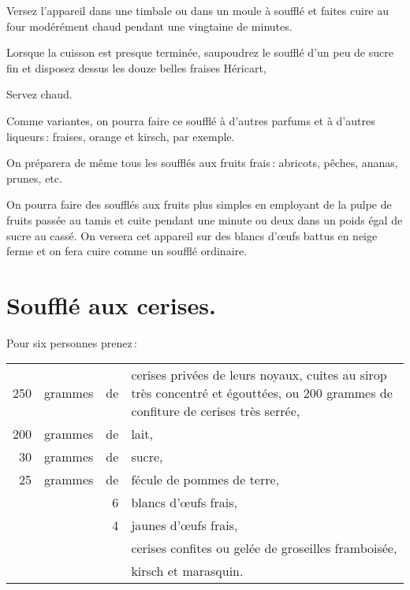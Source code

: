 Versez l'appareil dans une timbale ou dans un moule à soufflé et faites cuire au
four modérément chaud pendant une vingtaine de minutes.

Lorsque la cuisson est presque terminée, saupoudrez le soufflé d’un peu de
sucre fin et disposez dessus les douze belles fraises Héricart,

Servez chaud.

\sk

Comme variantes, on pourra faire ce soufflé à d'autres parfums et à d'autres
liqueurs : fraises, orange et kirsch, par exemple.

\sk

On préparera de même tous les soufflés aux fruits frais : abricots, pêches,
ananas, prunes, etc.

\sk

On pourra faire des soufflés aux fruits plus simples en employant de la pulpe
de fruits passée au tamis et cuite pendant une minute ou deux dans un poids égal
de sucre au cassé. On versera cet appareil sur des blancs d'œufs battus en neige
ferme et on fera cuire comme un soufflé ordinaire.

\section*{\centering Soufflé aux cerises.}
{}

Pour six personnes prenez :

\footnotesize
\begin{longtable}{rrrp{16em}}
    250 & grammes & de & cerises privées de leurs noyaux, cuites au sirop
                         très concentré et égouttées, ou 200 grammes de
                         confiture de cerises très serrée,                                                \\
    200 & grammes & de & lait,                                                                            \\
     30 & grammes & de & sucre,                                                                           \\
     25 & grammes & de & fécule de pommes de terre,                                                       \\
        &         &  6 & blancs d'œufs frais,                                                             \\
        &         &  4 & jaunes d'œufs frais,                                                             \\
        &         &    & cerises confites ou gelée de groseilles framboisée,                              \\
        &         &    & kirsch et marasquin.                                                             \\
\end{longtable}
\normalsize

